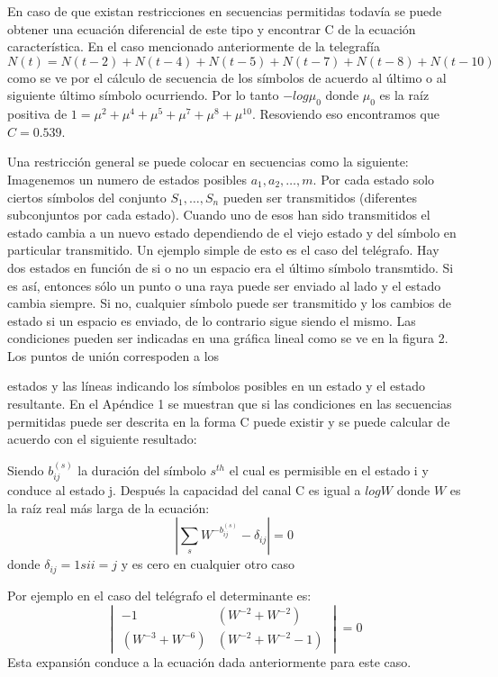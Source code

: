 En caso de que existan restricciones en secuencias permitidas
todav\'ia se puede obtener una ecuaci\'on diferencial de este tipo y
encontrar C de la ecuaci\'on caracter\'istica. En el caso mencionado
anteriormente de la telegraf\'ia
\begin{equation}
N(t) = N(t-2)+N(t-4)+N(t-5)+N(t-7)+N(t-8)+N(t-10)
\end{equation}
como se ve por el c\'alculo de secuencia de los s\'imbolos de acuerdo
al \'ultimo o al siguiente \'ultimo s\'imbolo ocurriendo.  Por lo
tanto $-log\mu_{0}$ donde $\mu_{0}$ es la ra\'iz positiva de $1
= \mu^{2}+\mu^{4}+\mu^{5}+\mu^{7}+\mu^{8}+\mu^{10}$. Resoviendo eso
encontramos que $C = 0.539$.

Una restricci\'on general se puede colocar en secuencias como la
siguiente: Imagenemos un numero de estados posibles $a_{1},
a_{2},\ldots,{m}$. Por cada estado solo ciertos s\'imbolos del
conjunto $S_{1},\ldots,S_{n}$ pueden ser transmitidos (diferentes
subconjuntos por cada estado). Cuando uno de esos han sido
transmitidos el estado cambia a un nuevo estado dependiendo de el
viejo estado y del s\'imbolo en particular transmitido. Un ejemplo
simple de esto es el caso del tel\'egrafo. Hay dos estados en
funci\'on de si o no un espacio era el \'ultimo s\'imbolo transmtido.
Si es as\'i, entonces s\'olo un punto o una raya puede ser enviado al
lado y el estado cambia siempre. Si no, cualquier s\'imbolo puede ser
transmitido y los cambios de estado si un espacio es enviado, de lo
contrario sigue siendo el mismo.  Las condiciones pueden ser indicadas
en una gr\'afica lineal como se ve en la figura 2. Los puntos de
uni\'on correspoden a los

estados y las l\'ineas indicando los s\'imbolos posibles en un estado
y el estado resultante.  En el Ap\'endice 1 se muestran que si las
condiciones en las secuencias permitidas puede ser descrita en la
forma C puede existir y se puede calcular de acuerdo con el siguiente
resultado:
\begin{theorem}
 Siendo $b_{ij}^{(s)}$ la duraci\'on del s\'imbolo $s^{th}$ el cual es
permisible en el estado i y conduce al estado j. Despu\'es la
capacidad del canal C es igual a $logW$ donde $W$ es la ra\'iz real
m\'as larga de la ecuaci\'on:
\begin{equation}
\left|\sum_{s}W^{-b_{ij}^{(s)}}-\delta_{ij}\right|=0
\end{equation}
donde $\delta_{ij}=1 si i=j$ y es cero en cualquier otro caso
\end{theorem}
Por ejemplo en el caso del tel\'egrafo el determinante es:
\begin{equation}
\begin{vmatrix}
-1&(W^{-2}+W^{-2}) \\ 
 (W^{-3}+W^{-6})&(W^{-2}+W^{-2}-1) 
\end{vmatrix}=0
\end{equation}
Esta expansi\'on conduce a la ecuaci\'on dada anteriormente para este caso.

